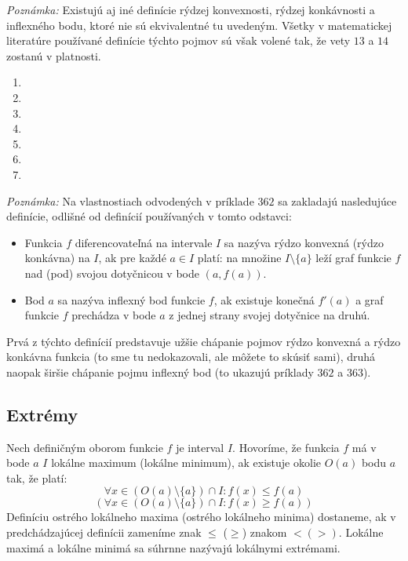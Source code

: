 \textit{Poznámka:}
Existujú aj iné definície rýdzej konvexnosti, rýdzej konkávnosti a inflexného
bodu, ktoré nie sú ekvivalentné tu uvedeným. Všetky v matematickej literatúre
používané definície týchto pojmov sú však volené tak, že vety $13$ a $14$
zostanú v platnosti.

\begin{enumerate}[resume]
  \item {}
  \item {}
  \item {}
  \item {}
  \item {}
  \item {}
  \item {}
\end{enumerate}

\textit{Poznámka:}
Na vlastnostiach odvodených v príklade $362$ sa zakladajú nasledujúce definície,
odlišné od definícií používaných v tomto odstavci:
\begin{itemize}
\item
  Funkcia $f$ diferencovateľná na intervale $I$ sa nazýva rýdzo konvexná (rýdzo
  konkávna) na $I$, ak pre každé $a\in I$ platí: na množine $I \setminus \{a\}$
  leží graf funkcie $f$ nad (pod) svojou dotyčnicou v bode $(a,f(a))$.
\item
  Bod $a$ sa nazýva inflexný bod funkcie $f$, ak existuje konečná $f'(a)$ a graf
  funkcie $f$ prechádza v bode $a$ z jednej strany svojej dotyčnice na druhú.
\end{itemize}
Prvá z týchto definícií predstavuje užšie chápanie pojmov rýdzo konvexná a rýdzo
konkávna funkcia (to sme tu nedokazovali, ale môžete to skúsiť sami), druhá
naopak širšie chápanie pojmu inflexný bod (to ukazujú príklady $362$ a $363$).

\subsection{Extrémy}
Nech definičným oborom funkcie $f$ je interval $I$. Hovoríme, že funkcia $f$ má
v bode $a$ $I$ lokálne maximum (lokálne minimum), ak existuje okolie $O(a)$ bodu
$a$ tak, že platí:
\[
  \forall x\in (O(a)\setminus \{a\})\cap I:f(x)\leq f(a)
\]
\[
  (\forall x\in (O(a)\setminus \{a\})\cap I:f(x)\geq f(a))
\]
Definíciu ostrého lokálneho maxima (ostrého lokálneho minima) dostaneme, ak v
predchádzajúcej definícii zameníme znak $\leq$ ($\geq$) znakom $<(>)$. Lokálne
maximá a lokálne minimá sa súhrnne nazývajú lokálnymi extrémami.

